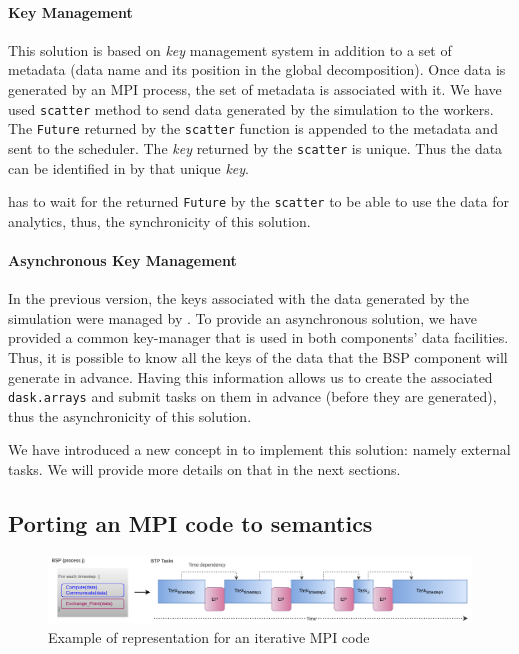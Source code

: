 \paragraph*{\dask Key Management}\label{sec:synchimplementation}

This solution is based on \dask \textit{key} management system in addition to a set of metadata (data name and its position in the global decomposition). Once data is generated by an MPI process, the set of metadata is associated with it.  We have used \texttt{scatter} method to send data generated by the simulation to the \dask workers.
The \texttt{Future} returned by the \texttt{scatter} function is appended to the metadata and sent to the scheduler. The \textit{key} returned by the \texttt{scatter} is unique. Thus the data can be identified in \dask by that unique \textit{key}. 

\dask has to wait for the returned \texttt{Future} by the \texttt{scatter} to be able to use the data for analytics, thus, the synchronicity of this solution. 

\paragraph*{Asynchronous Key Management}\label{sec:asynchimplementation}

In the previous version, the keys associated with the data generated by the simulation were managed by \dask. To provide an asynchronous solution, we have provided a common key-manager that is used in both components' data facilities. Thus, it is possible to know all the keys of the data that the BSP component will generate in advance. 
Having this information allows us to create the associated \texttt{dask.arrays} and submit tasks on them in advance (before they are generated), thus the asynchronicity of this solution.

We have introduced a new concept in \dask to implement this solution: namely external tasks. We will provide more details on that in the next sections. 
 


\subsection{Porting an MPI code to \deisa semantics}\label{sec:btp:porting}

\begin{figure}[tb]
\centerline{\includegraphics[width=\textwidth]{figures/unrolled.pdf}}
\caption{Example of \deisa representation for an iterative MPI code}
\label{figunroll}
\end{figure}

